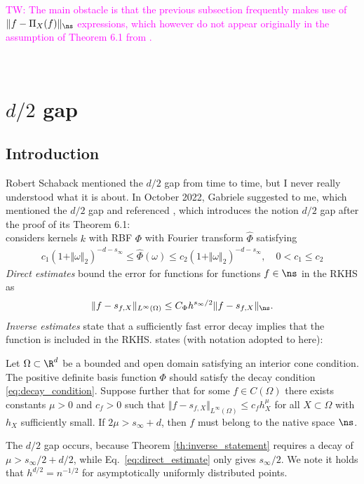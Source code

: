 \documentclass[a4paper, 10pt]{article}
\newcommand{\tw}[1]{\textcolor{magenta}{TW: #1}}
\begin{document}
\tw{The main obstacle is that the previous subsection frequently makes use of $\Vert f - \Pi_X(f) \Vert_{\ns}$ expressions, which however do not appear originally in the assumption of Theorem 6.1 from \cite{schaback2002inverse}.}






~ \newpage
~ \newpage










\section{$d/2$ gap}

\subsection{Introduction} \label{subsec:introduction}

Robert Schaback mentioned the $d/2$ gap from time to time, but I never really understood what it is about.
In October 2022, Gabriele suggested \cite{karvonen2022error} to me, which mentioned the $d/2$ gap and referenced \cite{schaback2002inverse}, which introduces the notion $d/2$ gap after the proof of its Theorem 6.1: \\
\cite{schaback2002inverse} considers kernels $k$ with RBF $\Phi$ with Fourier transform $\hat{\Phi}$ satisfying
\begin{align}
\label{eq:decay_condition}
c_1 (1+\Vert \omega \Vert_2)^{-d-s_\infty} \leq \hat{\Phi}(\omega) \leq c_2(1+\Vert \omega \Vert_2)^{-d-s_\infty}, \quad 0 < c_1 \leq c_2
\end{align}
\textit{Direct estimates} bound the error for functions for functions $f \in \ns$  in the RKHS as
\begin{align}
\label{eq:direct_estimate}
\Vert f - s_{f, X} \Vert_{L^\infty(\Omega)} \leq C_\Phi h^{s_\infty/2} \Vert f - s_{f, X} \Vert_{\ns}.
\end{align}
\textit{Inverse estimates} state that a sufficiently fast error decay implies that the function is included in the RKHS. 
\cite[Theorem 6.1]{schaback2002inverse} states (with notation adopted to here):
\begin{theorem}
%
Let $\Omega \subset \R^d$ be a bounded and open domain satisfying an interior cone condition. 
The positive definite basis function $\Phi$ should satisfy the decay condition \ref{eq:decay_condition}. 
Suppose further that for some $f \in C(\Omega)$ there exists constants $\mu > 0$ and $c_f > 0$ such that $\Vert f - s_{f, X}\Vert_{L^\infty(\Omega)} \leq c_f h_X^\mu$ for all $X \subset \Omega$ with $h_X$ sufficiently small. 
If $2\mu > s_\infty + d$, then $f$ must belong to the native space $\ns$.
\end{theorem}
The $d/2$ gap occurs, because Theorem \ref{th:inverse_statement} requires a decay of $\mu > s_\infty/2 + d/2$, while Eq.\ \ref{eq:direct_estimate} only gives $s_\infty/2$.
We note it holds that $h^{d/2} = n^{-1/2}$ for asymptotically uniformly distributed points.
\end{document}
